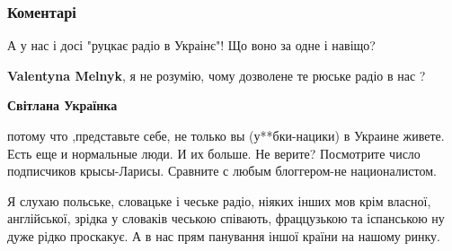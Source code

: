  
 
 
 
 
\subsubsection{Коментарі}

\begin{itemize}
 
А у нас і досі "руцкає радіо в Украінє"! Що воно за одне і навіщо?

\begin{itemize}
 
\textbf{Valentyna Melnyk}, я не розумію, чому дозволене те рюське радіо в нас ?

\begin{itemize}
 
\textbf{Світлана Українка} 

потому что ,представьте себе, не только вы (у**бки-нацики) в Украине живете.
Есть еще и нормальные люди. И их больше. Не верите? Посмотрите число
подписчиков крысы-Ларисы. Сравните с любым блоггером-не националистом.

\end{itemize}

\end{itemize}

 
Я слухаю польське, словацьке і чеське радіо, ніяких інших мов крім власної,
англійської, зрідка у словаків чеською співають, фраццузькою та іспанською ну
дуже рідко проскакує. А в нас прям панування іншої країни на нашому ринку.

\end{itemize}

